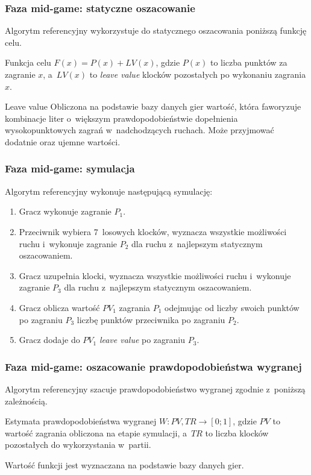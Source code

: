 \documentclass[10pt,a4paper]{beamer}
\begin{document}
\begin{frame}
	\frametitle{Faza mid-game: statyczne oszacowanie}
	
	Algorytm referencyjny wykorzystuje do statycznego oszacowania poniższą funkcję celu.

	\begin{block}{Funkcja celu}	
		$F(x) = P(x) + LV(x)$,
		\vskip5pt
		gdzie $P(x)$ to liczba punktów za zagranie $x$, a~$LV(x)$ to \emph{leave value} klocków pozostałych po wykonaniu zagrania $x$. 
	\end{block}

	\begin{block}{Leave value}	
		Obliczona na podstawie bazy danych gier wartość, która faworyzuje kombinacje liter o~większym prawdopodobieństwie dopełnienia wysokopunktowych zagrań w~nadchodzących ruchach. Może przyjmować dodatnie oraz ujemne wartości.
	\end{block}
\end{frame}

\begin{frame}
	\frametitle{Faza mid-game: symulacja}

	Algorytm referencyjny wykonuje następującą symulację:

	\begin{enumerate}
		\item Gracz wykonuje zagranie $P_{1}$.
		\item Przeciwnik wybiera 7~losowych klocków, wyznacza wszystkie możliwości ruchu i~wykonuje zagranie $P_{2}$ dla ruchu z~najlepszym statycznym oszacowaniem.
		\item Gracz uzupełnia klocki, wyznacza wszystkie możliwości ruchu i~wykonuje zagranie $P_{3}$ dla ruchu z~najlepszym statycznym oszacowaniem.
		\item Gracz oblicza wartość $PV_{1}$ zagrania $P_{1}$ odejmując od liczby swoich punktów po zagraniu $P_{3}$ liczbę punktów przeciwnika po zagraniu $P_{2}$.
		\item Gracz dodaje do $PV_{1}$ \emph{leave value} po zagraniu $P_{3}$.
	\end{enumerate}
\end{frame}

\begin{frame}
	\frametitle{Faza mid-game: oszacowanie prawdopodobieństwa wygranej}
	
	Algorytm referencyjny szacuje prawdopodobieństwo wygranej zgodnie z~poniższą zależnością.

	\begin{block}{Estymata prawdopodobieństwa wygranej}	
		$W: PV, TR \rightarrow [0;1]$,
		\vskip5pt
		gdzie $PV$ to wartość zagrania obliczona na etapie symulacji, a~$TR$ to liczba klocków pozostałych do wykorzystania w~partii.
	\end{block}

	Wartość funkcji jest wyznaczana na podstawie bazy danych gier.
\end{frame}
\end{document}
